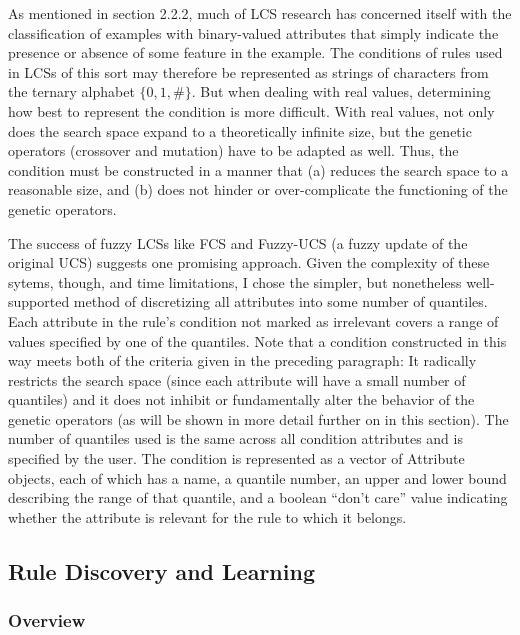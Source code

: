 \documentclass[11pt]{article}
\begin{document}
As mentioned in section 2.2.2, much of LCS research has concerned itself with the classification of examples with binary-valued attributes that simply indicate the presence or absence of some feature in the example. The conditions of rules used in LCSs of this sort may therefore be represented as strings of characters from the ternary alphabet $\{0,1,\#\}$. But when dealing with real values, determining how best to represent the condition is more difficult. With real values, not only does the search space expand to a theoretically infinite size, but the genetic operators (crossover and mutation) have to be adapted as well. Thus, the condition must be constructed in a manner that (a) reduces the search space to a reasonable size, and (b) does not hinder or over-complicate the functioning of the genetic operators.

The success of fuzzy LCSs like FCS \cite{manuel_valenzuela-rendon_fuzzy_1991} and Fuzzy-UCS \cite{orriols-puig_fuzzy-ucs:_2009} (a fuzzy update of the original UCS) suggests one promising approach. Given the complexity of these sytems, though, and time limitations, I chose the simpler, but nonetheless well-supported method of discretizing all attributes into some number of quantiles. Each attribute in the rule's condition not marked as irrelevant covers a range of values specified by one of the quantiles. Note that a condition constructed in this way meets both of the criteria given in the preceding paragraph: It radically restricts the search space (since each attribute will have a small number of quantiles) and it does not inhibit or fundamentally alter the behavior of the genetic operators (as will be shown in more detail further on in this section). The number of quantiles used is the same across all condition attributes and is specified by the user. The condition is represented as a vector of Attribute objects, each of which has a name, a quantile number, an upper and lower bound describing the range of that quantile, and a boolean ``don't care'' value indicating whether the attribute is relevant for the rule to which it belongs.

\subsection{Rule Discovery and Learning}

\subsubsection{Overview}
\end{document}

